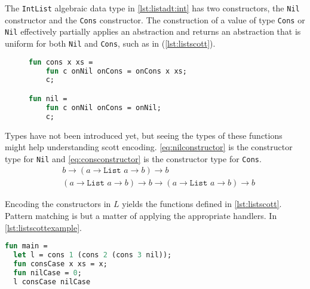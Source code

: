 \begin{exmp}
    The \texttt{IntList} algebraic data type in \autoref{lst:listadt:int} has two constructors, the \texttt{Nil} constructor and the \texttt{Cons} constructor.
    The construction of a value of type \texttt{Cons} or \texttt{Nil} effectively partially applies an abstraction and returns an abstraction that is uniform for both \texttt{Nil} and \texttt{Cons}, such as in (\autoref{lst:listscott}).
\begin{figure}
\begin{lstlisting}[language=ML,caption={List algebraic data type implementation},label={lst:listscott}]
fun cons x xs = 
    fun c onNil onCons = onCons x xs;
    c;

fun nil = 
    fun c onNil onCons = onNil;
    c;
\end{lstlisting}
\end{figure}

Types have not been introduced yet, but seeing the types of these functions might help understanding scott encoding.
\autoref{eq:nilconstructor} is the constructor type for \texttt{Nil} and \autoref{eq:consconstructor} is the constructor type for \texttt{Cons}.
\begin{align}
   &b \rightarrow (a \rightarrow \texttt{List } a \rightarrow b) \rightarrow b
   \label{eq:nilconstructor}\\
   &(a \rightarrow \texttt{List } a \rightarrow b) \rightarrow b \rightarrow (a \rightarrow \texttt{List } a \rightarrow b) \rightarrow b
   \label{eq:consconstructor}
\end{align}

Encoding the constructors in $L$ yields the functions defined in \autoref{lst:listscott}.
Pattern matching is but a matter of applying the appropriate handlers.
In \autoref{lst:listscottexample}.
\begin{lstlisting}[language=ML,caption={Example of scott encoded list algebraic data type},label={lst:listscottexample}]
fun main =
  let l = cons 1 (cons 2 (cons 3 nil));
  fun consCase x xs = x;
  fun nilCase = 0;
  l consCase nilCase
\end{lstlisting}
\end{exmp}

